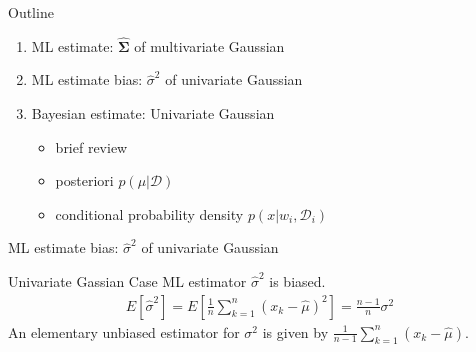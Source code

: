 \documentclass[compress,blue]{beamer}
\newcommand{\bSig}{\mathbf{\Sigma}}
\newcommand{\calD}{\mathcal{D}}
\begin{document}
\begin{frame}{Outline}
	\begin{enumerate}
		\item<1-> ML estimate: $\hat{\bSig}$ of multivariate Gaussian 
		\vspace{0.1in}
		\item<2-> ML estimate bias: $\hat{\sigma}^2$ of univariate Gaussian
		\vspace{0.1in}
		\item<0> Bayesian estimate: Univariate Gaussian
		\begin{itemize}
			\item brief review
			\item posteriori $p(\mu|\calD)$
			\item conditional probability density $p(x | w_i, \calD_i)$
		\end{itemize}
	\end{enumerate}
\end{frame}

\begin{frame}{ML estimate bias: $\hat{\sigma}^2$ of univariate Gaussian}
	\begin{block}{Univariate Gassian Case}
		ML estimator $\hat{\sigma}^2$ is biased.
		\begin{align}
			E[\hat{\sigma}^2] = E[\frac{1}{n}\sum_{k=1}^{n}(x_k-\hat{\mu})^2] = \frac{n-1}{n}\sigma^2
		\end{align}
		\small
		An elementary unbiased estimator for $\sigma^2$ is given by $\frac{1}{n-1}\sum_{k=1}^n(x_k - \hat{\mu})$.
		\normalsize
	\end{block}	
\end{frame}
\end{document}
